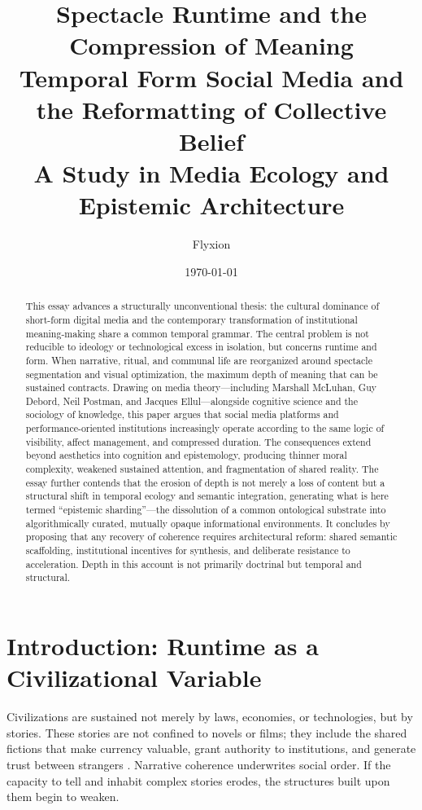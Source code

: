 \documentclass[11pt]{article}
\title{\textbf{Spectacle Runtime and the Compression of Meaning\\
Temporal Form Social Media and the Reformatting of Collective Belief}\\[0.5em]
\large A Study in Media Ecology and Epistemic Architecture}
\author{Flyxion}
\date{\today}
\begin{document}
\maketitle

\begin{abstract}
This essay advances a structurally unconventional thesis: the cultural dominance of short-form digital media and the contemporary transformation of institutional meaning-making share a common temporal grammar. The central problem is not reducible to ideology or technological excess in isolation, but concerns runtime and form. When narrative, ritual, and communal life are reorganized around spectacle segmentation and visual optimization, the maximum depth of meaning that can be sustained contracts. Drawing on media theory---including Marshall McLuhan, Guy Debord, Neil Postman, and Jacques Ellul---alongside cognitive science and the sociology of knowledge, this paper argues that social media platforms and performance-oriented institutions increasingly operate according to the same logic of visibility, affect management, and compressed duration. The consequences extend beyond aesthetics into cognition and epistemology, producing thinner moral complexity, weakened sustained attention, and fragmentation of shared reality. The essay further contends that the erosion of depth is not merely a loss of content but a structural shift in temporal ecology and semantic integration, generating what is here termed ``epistemic sharding''---the dissolution of a common ontological substrate into algorithmically curated, mutually opaque informational environments. It concludes by proposing that any recovery of coherence requires architectural reform: shared semantic scaffolding, institutional incentives for synthesis, and deliberate resistance to acceleration. Depth in this account is not primarily doctrinal but temporal and structural.
\end{abstract}

\newpage
\tableofcontents
\newpage

\section{Introduction: Runtime as a Civilizational Variable}

Civilizations are sustained not merely by laws, economies, or technologies, but by stories. These stories are not confined to novels or films; they include the shared fictions that make currency valuable, grant authority to institutions, and generate trust between strangers \citep{Harari2015}. Narrative coherence underwrites social order. If the capacity to tell and inhabit complex stories erodes, the structures built upon them begin to weaken.
\end{document}
